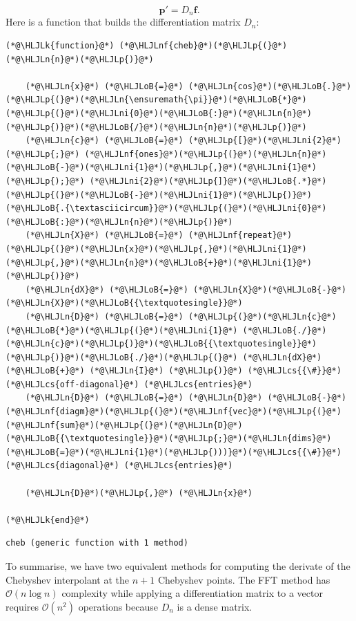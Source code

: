 \documentclass[12pt,a4paper]{article}
\newcommand{\HLJLk}[1]{\textcolor[RGB]{148,91,176}{\textbf{#1}}}
\newcommand{\HLJLn}[1]{#1}
\newcommand{\HLJLnf}[1]{\textcolor[RGB]{66,102,213}{#1}}
\newcommand{\HLJLni}[1]{\textcolor[RGB]{59,151,46}{#1}}
\newcommand{\HLJLoB}[1]{\textcolor[RGB]{102,102,102}{\textbf{#1}}}
\newcommand{\HLJLp}[1]{#1}
\newcommand{\HLJLcs}[1]{\textcolor[RGB]{153,153,119}{\textit{#1}}}
\begin{document}
\[
\mathbf{p}' = D_n \mathbf{f}.
\]
Here is a function that builds the differentiation matrix $D_n$:


\begin{lstlisting}
(*@\HLJLk{function}@*) (*@\HLJLnf{cheb}@*)(*@\HLJLp{(}@*)(*@\HLJLn{n}@*)(*@\HLJLp{)}@*)

    (*@\HLJLn{x}@*) (*@\HLJLoB{=}@*) (*@\HLJLn{cos}@*)(*@\HLJLoB{.}@*)(*@\HLJLp{(}@*)(*@\HLJLn{\ensuremath{\pi}}@*)(*@\HLJLoB{*}@*)(*@\HLJLp{(}@*)(*@\HLJLni{0}@*)(*@\HLJLoB{:}@*)(*@\HLJLn{n}@*)(*@\HLJLp{)}@*)(*@\HLJLoB{/}@*)(*@\HLJLn{n}@*)(*@\HLJLp{)}@*)
    (*@\HLJLn{c}@*) (*@\HLJLoB{=}@*) (*@\HLJLp{[}@*)(*@\HLJLni{2}@*)(*@\HLJLp{;}@*) (*@\HLJLnf{ones}@*)(*@\HLJLp{(}@*)(*@\HLJLn{n}@*)(*@\HLJLoB{-}@*)(*@\HLJLni{1}@*)(*@\HLJLp{,}@*)(*@\HLJLni{1}@*)(*@\HLJLp{);}@*) (*@\HLJLni{2}@*)(*@\HLJLp{]}@*)(*@\HLJLoB{.*}@*)(*@\HLJLp{(}@*)(*@\HLJLoB{-}@*)(*@\HLJLni{1}@*)(*@\HLJLp{)}@*)(*@\HLJLoB{.{\textasciicircum}}@*)(*@\HLJLp{(}@*)(*@\HLJLni{0}@*)(*@\HLJLoB{:}@*)(*@\HLJLn{n}@*)(*@\HLJLp{)}@*)
    (*@\HLJLn{X}@*) (*@\HLJLoB{=}@*) (*@\HLJLnf{repeat}@*)(*@\HLJLp{(}@*)(*@\HLJLn{x}@*)(*@\HLJLp{,}@*)(*@\HLJLni{1}@*)(*@\HLJLp{,}@*)(*@\HLJLn{n}@*)(*@\HLJLoB{+}@*)(*@\HLJLni{1}@*)(*@\HLJLp{)}@*)
    (*@\HLJLn{dX}@*) (*@\HLJLoB{=}@*) (*@\HLJLn{X}@*)(*@\HLJLoB{-}@*)(*@\HLJLn{X}@*)(*@\HLJLoB{{\textquotesingle}}@*)
    (*@\HLJLn{D}@*) (*@\HLJLoB{=}@*) (*@\HLJLp{(}@*)(*@\HLJLn{c}@*)(*@\HLJLoB{*}@*)(*@\HLJLp{(}@*)(*@\HLJLni{1}@*) (*@\HLJLoB{./}@*)(*@\HLJLn{c}@*)(*@\HLJLp{)}@*)(*@\HLJLoB{{\textquotesingle}}@*)(*@\HLJLp{)}@*)(*@\HLJLoB{./}@*)(*@\HLJLp{(}@*) (*@\HLJLn{dX}@*) (*@\HLJLoB{+}@*) (*@\HLJLn{I}@*) (*@\HLJLp{)}@*) (*@\HLJLcs{{\#}}@*) (*@\HLJLcs{off-diagonal}@*) (*@\HLJLcs{entries}@*)
    (*@\HLJLn{D}@*) (*@\HLJLoB{=}@*) (*@\HLJLn{D}@*) (*@\HLJLoB{-}@*) (*@\HLJLnf{diagm}@*)(*@\HLJLp{(}@*)(*@\HLJLnf{vec}@*)(*@\HLJLp{(}@*)(*@\HLJLnf{sum}@*)(*@\HLJLp{(}@*)(*@\HLJLn{D}@*)(*@\HLJLoB{{\textquotesingle}}@*)(*@\HLJLp{;}@*)(*@\HLJLn{dims}@*)(*@\HLJLoB{=}@*)(*@\HLJLni{1}@*)(*@\HLJLp{)))}@*)(*@\HLJLcs{{\#}}@*) (*@\HLJLcs{diagonal}@*) (*@\HLJLcs{entries}@*)
    
    (*@\HLJLn{D}@*)(*@\HLJLp{,}@*) (*@\HLJLn{x}@*)

(*@\HLJLk{end}@*)
\end{lstlisting}

\begin{lstlisting}
cheb (generic function with 1 method)
\end{lstlisting}


To summarise, we have two equivalent methods for computing the derivate of the Chebyshev interpolant at the $n+1$ Chebyshev points.  The FFT method has $\mathcal{O}(n\log n)$ complexity while  applying a differentiation matrix to a vector requires $\mathcal{O}(n^2)$ operations because $D_n$ is a dense matrix.
\end{document}
